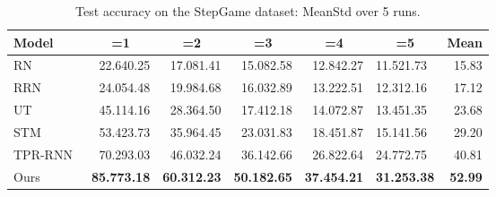\documentclass[letterpaper]{article} \usepackage{aaai22}  \usepackage{times}  \usepackage{helvet}  \usepackage{courier}  \usepackage[hyphens]{url}  \usepackage{graphicx} \urlstyle{rm} \def\UrlFont{\rm}  \usepackage{natbib}  \usepackage{caption} \DeclareCaptionStyle{ruled}{labelfont=normalfont,labelsep=colon,strut=off} \frenchspacing  \setlength{\pdfpagewidth}{8.5in}  \setlength{\pdfpageheight}{11in}  \usepackage{algorithm}
\begin{document}
\begin{table*}[!th]
\small
\centering
\begin{adjustbox}{max width=0.92\textwidth}
\begin{tabular}{l|rrrrl|r}
\hline
\hline
Model & \multicolumn{1}{c}{=1} & \multicolumn{1}{c}{=2} & \multicolumn{1}{c}{=3} & \multicolumn{1}{c}{=4} & \multicolumn{1}{c|}{=5} & Mean \\ \hline
RN~\cite{santoro2017simple}          & 22.640.25 & 17.081.41 & 15.082.58 & 12.842.27 & 11.521.73 & 15.83 \\
RRN~\cite{palm2018recurrent}         & 24.054.48 & 19.984.68 & 16.032.89 & 13.222.51 & 12.312.16 & 17.12 \\
UT~\cite{dehghani2018universal}      & 45.114.16 & 28.364.50 & 17.412.18 & 14.072.87 & 13.451.35 & 23.68 \\
STM~\cite{le2020self}                & 53.423.73 & 35.964.45 & 23.031.83 & 18.451.87 & 15.141.56 & 29.20 \\
TPR-RNN~\cite{schlag2018learning}    & 70.293.03 & 46.032.24 & 36.142.66 & 26.822.64 & 24.772.75 & 40.81 \\ \hline
Ours                         & \textbf{85.773.18}  & \textbf{60.312.23} & \textbf{50.182.65} & \textbf{37.454.21} & \textbf{31.253.38} & \textbf{52.99} \\ \hline
\hline
\end{tabular}
\end{adjustbox}
\caption{Test accuracy on the StepGame dataset: MeanStd over 5 runs.}
\label{tbls:step_game_hard}
\vspace{0.5em}
\end{table*}
\end{document}
